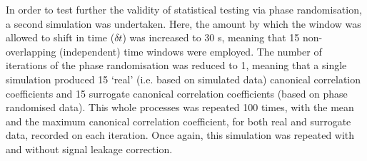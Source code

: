 In order to test further the validity of statistical testing via phase randomisation, a second simulation was undertaken. Here, the amount by which the window was allowed to shift in time ($\delta t$) was increased to 30 s, meaning that 15 non-overlapping (independent) time windows were employed. The number of iterations of the phase randomisation was reduced to 1, meaning that a single simulation produced 15 ‘real’ (i.e. based on simulated data) canonical correlation coefficients and 15 surrogate canonical correlation coefficients (based on phase randomised data). This whole processes was repeated 100 times, with the mean and the maximum canonical correlation coefficient, for both real and surrogate data, recorded on each iteration. Once again, this simulation was repeated with and without signal leakage correction. \clearpage

